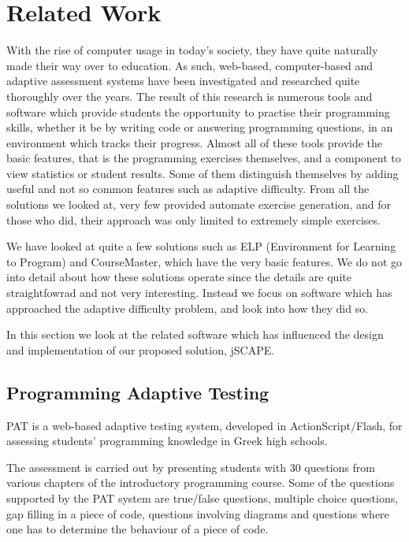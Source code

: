 \chapter{Related Work}
\label{chap:related-work}
With the rise of computer usage in today's society, they have quite naturally made their way over to education. As such, web-based, computer-based and adaptive assessment systems have been investigated and researched quite thoroughly over the years. The result of this research is numerous tools and software which provide students the opportunity to practise their programming skills, whether it be by writing code or answering programming questions, in an environment which tracks their progress. Almost all of these tools provide the basic features, that is the programming exercises themselves, and a component to view statistics or student results. Some of them distinguish themselves by adding useful and not so common features such as adaptive difficulty. From all the solutions we looked at, very few provided automate exercise generation, and for those who did, their approach was only limited to extremely simple exercises. \newline

We have looked at quite a few solutions such as ELP (Environment for Learning to Program) and CourseMaster, which have the very basic features. We do not go into detail about how these solutions operate since the details are quite straightfowrad and not very interesting. Instead we focus on software which has approached the adaptive difficulty problem, and look into how they did so.\newline

In this section we look at the related software which has influenced the design and implementation of our proposed solution, jSCAPE.

\section{Programming Adaptive Testing}
\label{sec:PAT}
PAT\cite{PAT} is a web-based adaptive testing system, developed in ActionScript/Flash, for assessing students' programming knowledge in Greek high schools. \newline

The assessment is carried out by presenting students with 30 questions from various chapters of the introductory programming course. Some of the questions supported by the PAT system are true/false questions, multiple choice questions, gap filling in a piece of code, questions involving diagrams and questions where one has to determine the behaviour of a piece of code.\newline

